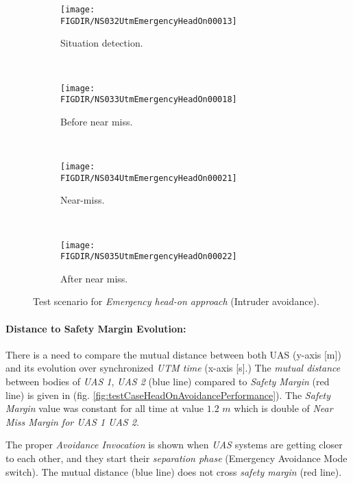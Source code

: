 \begin{figure}[H]
    \centering
    \begin{subfigure}{0.75\textwidth}
        \centering
        \texttt{[image: \\FIGDIR/NS032UtmEmergencyHeadOn00013]}
        \caption{Situation detection.}
        \label{fig:emergencyHeadOnSituationDetection}
    \end{subfigure}
    \\
    \begin{subfigure}{0.75\textwidth}
        \centering
        \texttt{[image: \\FIGDIR/NS033UtmEmergencyHeadOn00018]} 
        \caption{Before near miss.}
        \label{fig:emergencyHeadOnBeforeNearMiss}
    \end{subfigure}
    \\
    \begin{subfigure}{0.75\textwidth}
        \centering
        \texttt{[image: \\FIGDIR/NS034UtmEmergencyHeadOn00021]} 
        \caption{Near-miss.}
        \label{fig:emergencyHeadOnNearMiss}
    \end{subfigure}
    \\
    \begin{subfigure}{0.75\textwidth}
        \centering
        \texttt{[image: \\FIGDIR/NS035UtmEmergencyHeadOn00022]} 
        \caption{After near miss.}
        \label{fig:emergencyHeadOnAfterNearMiss}
    \end{subfigure}
    \caption{Test scenario for \emph{Emergency head-on approach} (Intruder avoidance). }
    \label{fig:testCaseEmergencyHeadOnApproach}
\end{figure}


\paragraph{Distance to Safety Margin Evolution:} There is a need to compare the mutual distance between both UAS (y-axis [m]) and its evolution over synchronized \emph{UTM time} (x-axis [s].) The \emph{mutual distance} between bodies of \emph{UAS 1}, \emph{UAS 2} (blue line) compared to \emph{Safety Margin} (red line) is given in (fig. \ref{fig:testCaseHeadOnAvoidancePerformance}). The \emph{Safety Margin} value was constant for all time at value $1.2$ $m$ which is double of \emph{Near Miss Margin for UAS 1 UAS 2}.

The proper \emph{Avoidance Invocation} is shown when \emph{UAS} systems are getting closer to each other, and they start their \emph{separation phase} (Emergency Avoidance Mode switch). The mutual distance (blue line) does not cross \emph{safety margin} (red line).

